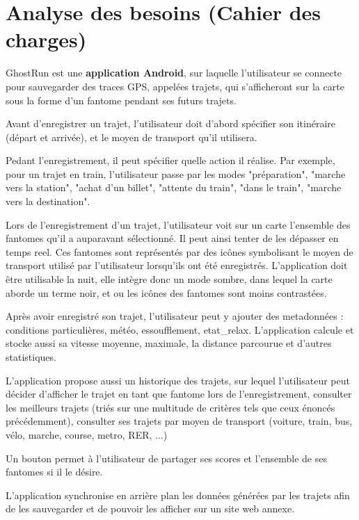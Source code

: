 \chapter{Analyse des besoins (Cahier des charges)}

GhostRun est une \textbf{application Android}, sur laquelle l'utilisateur se connecte pour sauvegarder des traces GPS, appelées trajets, qui s'afficheront sur la carte sous la forme d'un \gls{fantome} pendant ses futurs trajets.

Avant d'enregistrer un trajet, l'utilisateur doit d'abord spécifier son itinéraire (départ et arrivée), et le moyen de transport qu'il utilisera. 

Pedant l'enregistrement, il peut spécifier quelle action il réalise. Par exemple, pour un trajet en train, l'utilisateur passe par les modes "préparation", "marche vers la station", "achat d'un billet", "attente du train", "dans le train", "marche vers la destination".

Lors de l'enregistrement d'un trajet, l'utilisateur voit sur un carte l'ensemble des \glspl{fantome} qu'il a auparavant sélectionné. Il peut ainsi tenter de les dépasser en temps reel. Ces \glspl{fantome} sont représentés par des icônes symbolisant le moyen de transport utilisé par l'utilisateur lorsqu'ils ont été enregistrés. L'application doit être utilisable la nuit, elle intègre donc un mode sombre, dans lequel la carte aborde un terme noir, et ou les icônes des \glspl{fantome} sont moins contrastées.

Après avoir enregistré son trajet, l'utilisateur peut y ajouter des metadonnées : conditions particulières, météo, essoufflement, \gls{etat_relax}. L'application calcule et stocke aussi sa vitesse moyenne, maximale, la distance parcourue et d'autres statistiques.

L'application propose aussi un historique des trajets, sur lequel l'utilisateur peut décider d'afficher le trajet en tant que \gls{fantome} lors de l'enregistrement, consulter les meilleurs trajets (triés sur une multitude de critères tels que ceux énoncés précédemment), consulter ses trajets par moyen de transport (voiture, train, bus, vélo, marche, course, metro, RER, ...)

Un bouton permet à l'utilisateur de partager ses scores et l'ensemble de ses \glspl{fantome} si il le désire.

L'application synchronise en arrière plan les données générées par les trajets afin de les sauvegarder et de pouvoir les afficher sur un site web annexe.
